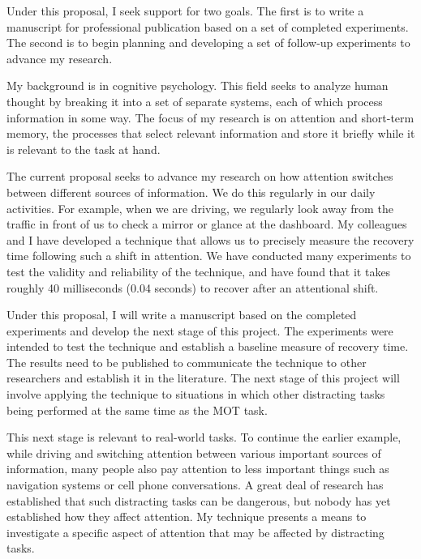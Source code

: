 \documentclass[12pt]{article}
\newcommand{\MySection}[2]{%
  \normalfont\normalsize\noindent{\bf#1.\hspace{1em}#2}}
\begin{document}
\MySection{A}{Summary Description}


Under this proposal, I seek support for two goals.  The first is to write a
manuscript for professional publication based on a set of completed
experiments.  The second is to begin planning and developing a set of
follow-up experiments to advance my research.


My background is in cognitive psychology.  This field seeks to analyze
human thought by breaking it into a set of separate systems, each of which
process information in some way.  The focus of my research is on attention
and short-term memory, the processes that select relevant information and
store it briefly while it is relevant to the task at hand.


The current proposal seeks to advance my research on how attention switches
between different sources of information.  We do this regularly in our
daily activities.  For example, when we are driving, we regularly look away
from the traffic in front of us to check a mirror or glance at the
dashboard.  My colleagues and I have developed a technique that allows us
to precisely measure the recovery time following such a shift in attention.
We have conducted many experiments to test the validity and reliability of
the technique, and have found that it takes roughly 40 milliseconds (0.04
seconds) to recover after an attentional shift.


Under this proposal, I will write a manuscript based on the completed
experiments and develop the next stage of this project.  The experiments
were intended to test the technique and establish a baseline measure of
recovery time.  The results need to be published to communicate the
technique to other researchers and establish it in the literature. The next
stage of this project will involve applying the technique to situations in
which other distracting tasks being performed at the same time as the MOT
task.

This next stage is relevant to real-world tasks.  To continue the earlier
example, while driving and switching attention between various important
sources of information, many people also pay attention to less important
things such as navigation systems or cell phone conversations.  A great
deal of research has established that such distracting tasks can be
dangerous, but nobody has yet established how they affect attention.  My
technique presents a means to investigate a specific aspect of attention
that may be affected by distracting tasks.
\end{document}
